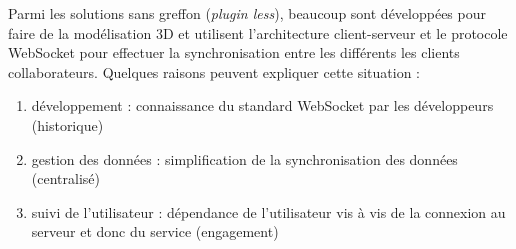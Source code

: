 Parmi les solutions sans greffon (\textit{plugin less}), beaucoup sont développées 
pour faire de la modélisation 3D  et utilisent l'architecture client-serveur et le 
protocole 
\gls{WebSocket} pour effectuer la synchronisation entre les différents les clients 
collaborateurs. Quelques raisons peuvent expliquer cette situation :
\begin{enumerate}
	\item développement : connaissance du standard \gls{WebSocket} par les 
	développeurs (historique)
	\item gestion des données : simplification de la synchronisation des données 
	(centralisé)
	\item suivi de l'utilisateur : dépendance de l'utilisateur vis à vis de la connexion 
	au serveur et donc du service (engagement) 
\end{enumerate}

